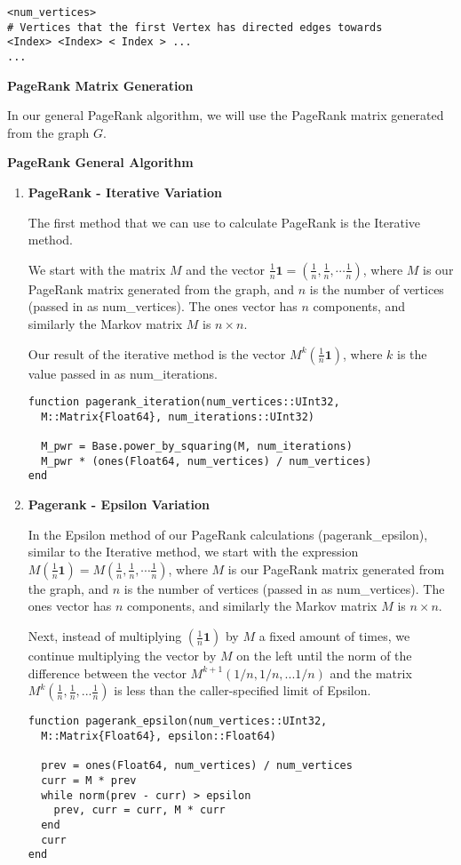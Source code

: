 \documentclass[12pt, titlepage, twoside]{amsart}
\renewcommand{\vec}[1]{\ensuremath{\mathbf{#1}}}
\theoremstyle{remark}
\begin{document}
\begin{lstlisting}[basicstyle=\small]
<num_vertices>
# Vertices that the first Vertex has directed edges towards
<Index> <Index> < Index > ...
...
\end{lstlisting}

\textbf{PageRank Matrix Generation}

In our general PageRank algorithm, we will use the PageRank matrix generated from the graph $G$.

\textbf{PageRank General Algorithm}

\begin{enumerate}

\item \textbf{PageRank - Iterative Variation}

The first method that we can use to calculate PageRank is the Iterative method. 


We start with the matrix $M$ and the vector $\frac{1}{n}\vec{1} = (\frac{1}{n}, \frac{1}{n}, \cdots \frac{1}{n})$, where $M$ is our PageRank matrix generated from the graph, and $n$ is the number of vertices (passed in as num\_vertices). The ones vector has $n$ components, and similarly the Markov matrix $M$ is $n\times n$.

Our result of the iterative method is the vector $M^k (\frac{1}{n}\vec{1})$, where $k$ is the value passed in as num\_iterations.

\begin{lstlisting}
function pagerank_iteration(num_vertices::UInt32,
  M::Matrix{Float64}, num_iterations::UInt32)
  
  M_pwr = Base.power_by_squaring(M, num_iterations)
  M_pwr * (ones(Float64, num_vertices) / num_vertices)
end
\end{lstlisting}


\item \textbf{Pagerank - Epsilon Variation}

In the Epsilon method of our PageRank calculations (pagerank\_epsilon), similar to the Iterative method, we start with the expression $M(\frac{1}{n}\vec{1}) = M(\frac{1}{n}, \frac{1}{n}, \cdots \frac{1}{n})$, where $M$ is our PageRank matrix generated from the graph, and $n$ is the number of vertices (passed in as num\_vertices). The ones vector has $n$ components, and similarly the Markov matrix $M$ is $n\times n$.

Next, instead of multiplying $(\frac{1}{n}\vec{1})$ by $M$ a fixed amount of times, we continue multiplying the vector by $M$ on the left until the norm of the difference between the vector $M^{k+1}(1/n, 1/n, ... 1/n)$ and the matrix $M^k(\frac{1}{n}, \frac{1}{n}, ... \frac{1}{n})$ is less than the caller-specified limit of Epsilon.

\begin{lstlisting}
function pagerank_epsilon(num_vertices::UInt32, 
  M::Matrix{Float64}, epsilon::Float64)
  
  prev = ones(Float64, num_vertices) / num_vertices
  curr = M * prev
  while norm(prev - curr) > epsilon
    prev, curr = curr, M * curr
  end
  curr
end
\end{lstlisting}

\end{enumerate}
\end{document}
